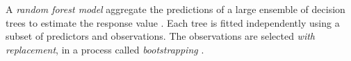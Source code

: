 \documentclass{article}
\begin{document}

	
	A \textit{random forest model} aggregate the predictions of a large ensemble of decision trees to estimate the response value \cite{breiman2001random}. Each tree is fitted independently using a subset of predictors and observations. The observations are selected \textit{with replacement}, in a process called \textit{bootstrapping} \cite{efron1994introduction}.
	
\end{document}
